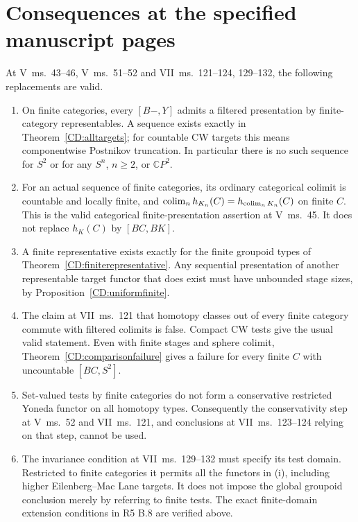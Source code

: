 \section{Consequences at the specified manuscript pages}
\label{sec:manuscript-CD}

\begin{theorem}
\label{CD:manuscript}
At V~ms.~43--46, V~ms.~51--52 and VII~ms.~121--124, 129--132,
the following replacements are valid.
\begin{enumerate}[label=(\roman*)]
\item On finite categories, every $[B-,Y]$ admits a filtered
presentation by finite-category representables.  A sequence exists
exactly in Theorem~\ref{CD:alltargets}; for countable CW targets this
means componentwise Postnikov truncation.  In particular there is no
such sequence for $S^2$ or for any $S^n$, $n\ge2$, or $\mathbb CP^2$.
\item For an actual sequence of finite categories, its ordinary
categorical colimit is countable and locally finite, and
$\operatorname{colim}_n h_{K_n}(C)=h_{\operatorname{colim}_nK_n}(C)$ on finite $C$.
This is the valid categorical finite-presentation assertion at
V~ms.~45.  It does not replace $h_K(C)$ by $[BC,BK]$.
\item A finite representative exists exactly for the finite groupoid
types of Theorem~\ref{CD:finiterepresentative}.  Any sequential
presentation of another representable target functor that does exist
must have unbounded stage sizes, by Proposition~\ref{CD:uniformfinite}.
\item The claim at VII~ms.~121 that homotopy classes out of every
finite category commute with filtered colimits is false.  Compact
CW tests give the usual valid statement.  Even with finite stages
and sphere colimit, Theorem~\ref{CD:comparisonfailure} gives a failure
for every finite $C$ with uncountable $[BC,S^2]$.
\item Set-valued tests by finite categories do not form a conservative
restricted Yoneda functor on all homotopy types.  Consequently the
conservativity step at V~ms.~52 and VII~ms.~121, and conclusions
at VII~ms.~123--124 relying on that step, cannot be used.
\item The invariance condition at VII~ms.~129--132 must specify its
test domain.  Restricted to finite categories it permits all the
functors in (i), including higher Eilenberg--Mac Lane targets.  It does
not impose the global groupoid conclusion merely by referring to
finite tests.  The exact finite-domain extension conditions in
R5 B.8 are verified above.
\end{enumerate}
\end{theorem}
